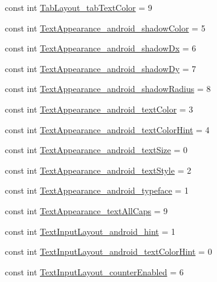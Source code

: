 \begin{CompactItemize}
const int \hyperlink{class__2doo_1_1_droid_1_1_resource_1_1_styleable_c112cf30f1d195c57d0242254ac576a9}{TabLayout\_\-tabTextColor} = 9
\item 
const int \hyperlink{class__2doo_1_1_droid_1_1_resource_1_1_styleable_b990461e43cbd95e7763f08dcde2fc2e}{TextAppearance\_\-android\_\-shadowColor} = 5
\item 
const int \hyperlink{class__2doo_1_1_droid_1_1_resource_1_1_styleable_03250bb4e0f50f1994effb65255d0ff8}{TextAppearance\_\-android\_\-shadowDx} = 6
\item 
const int \hyperlink{class__2doo_1_1_droid_1_1_resource_1_1_styleable_b779bf19766d483ee84d68ed0c450967}{TextAppearance\_\-android\_\-shadowDy} = 7
\item 
const int \hyperlink{class__2doo_1_1_droid_1_1_resource_1_1_styleable_7ecce893f63c5111c05ae19d973164f5}{TextAppearance\_\-android\_\-shadowRadius} = 8
\item 
const int \hyperlink{class__2doo_1_1_droid_1_1_resource_1_1_styleable_5d08a79da6e7902878de0d63f91ee0c8}{TextAppearance\_\-android\_\-textColor} = 3
\item 
const int \hyperlink{class__2doo_1_1_droid_1_1_resource_1_1_styleable_fd9a178cd7584ebf2b9716b71cb6bb29}{TextAppearance\_\-android\_\-textColorHint} = 4
\item 
const int \hyperlink{class__2doo_1_1_droid_1_1_resource_1_1_styleable_a9ca9439046fbab4a75d43662b3c183d}{TextAppearance\_\-android\_\-textSize} = 0
\item 
const int \hyperlink{class__2doo_1_1_droid_1_1_resource_1_1_styleable_9098bc45d33717b79f33eb227274719e}{TextAppearance\_\-android\_\-textStyle} = 2
\item 
const int \hyperlink{class__2doo_1_1_droid_1_1_resource_1_1_styleable_55ddf0b8d2ca7f0d281e1fb247c9122d}{TextAppearance\_\-android\_\-typeface} = 1
\item 
const int \hyperlink{class__2doo_1_1_droid_1_1_resource_1_1_styleable_26d42d5d6ee6cccc2076f43106cc7fa7}{TextAppearance\_\-textAllCaps} = 9
\item 
const int \hyperlink{class__2doo_1_1_droid_1_1_resource_1_1_styleable_d8a00dba70074cdd1ceb08cf690cd147}{TextInputLayout\_\-android\_\-hint} = 1
\item 
const int \hyperlink{class__2doo_1_1_droid_1_1_resource_1_1_styleable_8842f3035ace1330ee6f80328717fef0}{TextInputLayout\_\-android\_\-textColorHint} = 0
\item 
const int \hyperlink{class__2doo_1_1_droid_1_1_resource_1_1_styleable_dd16147b8f2534a36594db439b17e302}{TextInputLayout\_\-counterEnabled} = 6

\end{CompactItemize}
